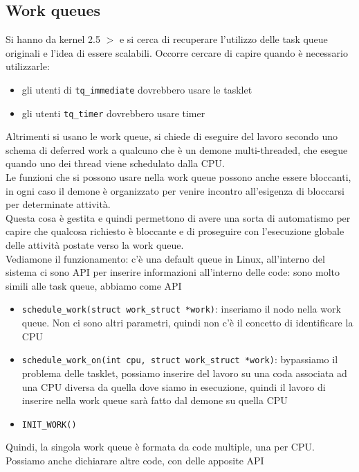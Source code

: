 \documentclass[12pt, oneside]{extbook}
\begin{document}
\subsection{Work queues}
Si hanno da kernel 2.5 $>$ e si cerca di recuperare l'utilizzo delle task queue originali e l'idea di essere scalabili. Occorre cercare di capire quando è necessario utilizzarle:
\begin{itemize}
\item gli utenti di \texttt{tq\_immediate} dovrebbero usare le tasklet
\item gli utenti \texttt{tq\_timer} dovrebbero usare timer 
\end{itemize}
Altrimenti si usano le work queue, si chiede di eseguire del lavoro secondo uno schema di deferred work a qualcuno che è un demone multi-threaded, che esegue quando uno dei thread viene schedulato dalla CPU.\\Le funzioni che si possono usare nella work queue possono anche essere bloccanti, in ogni caso il demone è organizzato per venire incontro all'esigenza di bloccarsi per determinate attività.\\Questa cosa è gestita e quindi permettono di avere una sorta di automatismo per capire che qualcosa richiesto è bloccante e di proseguire con l'esecuzione globale delle attività postate verso la work queue.\\Vediamone il funzionamento: c'è una default queue in Linux, all'interno del sistema ci sono API per inserire informazioni all'interno delle code: sono molto simili alle task queue, abbiamo come API
\begin{itemize}
\item \texttt{schedule\_work(struct work\_struct *work)}: inseriamo il nodo nella work queue. Non ci sono altri parametri, quindi non c'è il concetto di identificare la CPU
\item \texttt{schedule\_work\_on(int cpu, struct work\_struct *work)}: bypassiamo il problema delle tasklet, possiamo inserire del lavoro su una coda associata ad una CPU diversa da quella dove siamo in esecuzione, quindi il lavoro di inserire nella work queue sarà fatto dal demone su quella CPU
\item \texttt{INIT\_WORK()}
\end{itemize}
Quindi, la singola work queue è formata da code multiple, una per CPU. Possiamo anche dichiarare altre code, con delle apposite API
\end{document}
